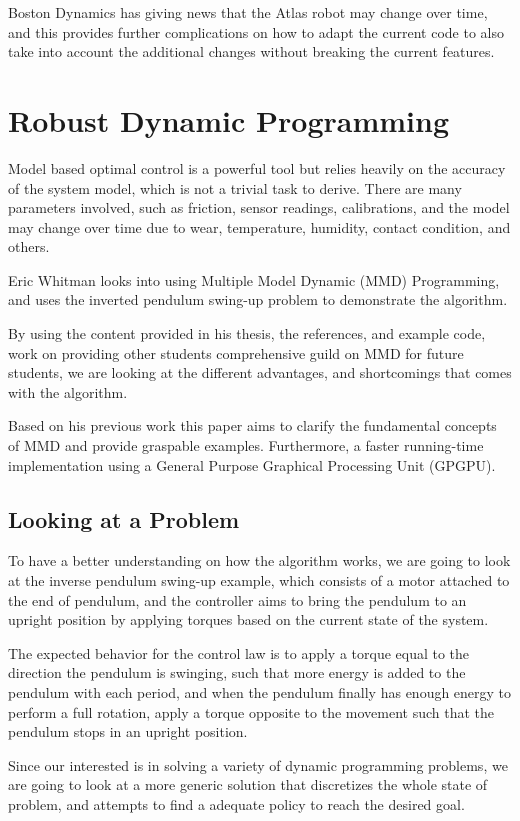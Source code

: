 \documentclass{article}
\begin{document}
Boston Dynamics has giving news that the Atlas robot may change over time, and this provides further complications on how to adapt the current code to also take into account the additional changes without breaking the current features. 

\section{Robust Dynamic Programming}
Model based optimal control is a powerful tool but relies heavily on the accuracy of the system model, which is not a trivial task to derive. There are many parameters involved, such as friction, sensor readings, calibrations, and the model may change over time due to wear, temperature, humidity, contact condition, and others.

Eric Whitman looks into using Multiple Model Dynamic (MMD) Programming, and uses the inverted pendulum swing-up problem to demonstrate the algorithm. \cite{eric_thesis}
 
By using the content provided in his thesis, the references, and example code, work on providing other students comprehensive guild on MMD for future students, we are looking at the different advantages, and shortcomings that comes with the algorithm.

Based on his previous work this paper aims to clarify the fundamental concepts of MMD and provide graspable examples. Furthermore, a faster running-time implementation using a General Purpose Graphical Processing Unit (GPGPU).

\subsection{Looking at a Problem}
To have a better understanding on how the algorithm works, we are going to look at the  inverse pendulum swing-up example, which consists of a motor attached to the end of pendulum, and the controller aims to bring the pendulum to an upright position by applying torques based on the current state of the system. 

The expected behavior for the control law is to apply a torque equal to the direction the pendulum is swinging, such that more energy is added to the pendulum with each period, and when the pendulum finally has enough energy to perform a full rotation, apply a torque opposite to the movement such that the pendulum stops in an upright position.  

Since our interested is in solving a variety of dynamic programming problems, we are going to look at a more generic solution that discretizes the whole state of problem, and attempts to find a adequate policy to reach the desired goal.
\end{document}
